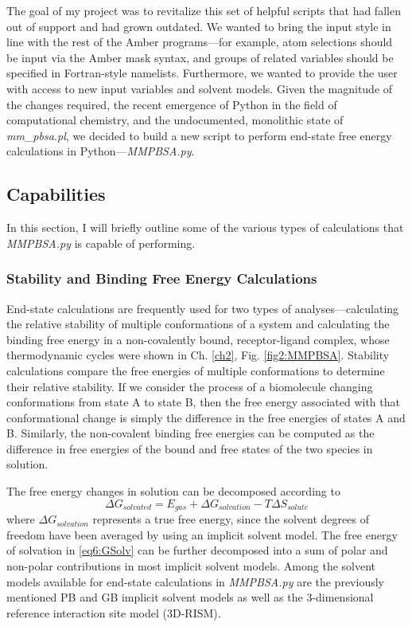 The goal of my project was to revitalize this set of helpful scripts that had
fallen out of support and had grown outdated. We wanted to bring the input style
in line with the rest of the Amber programs---for example, atom selections
should be input via the Amber mask syntax, and groups of related variables
should be specified in Fortran-style namelists. Furthermore, we wanted to
provide the user with access to new input variables and solvent models. Given
the magnitude of the changes required, the recent emergence of Python in the
field of computational chemistry, \cite{Sanner1999, Cock2009,
Michaud-Agrawal2011, MMPBSApy} and the undocumented, monolithic state of
\emph{mm\_pbsa.pl}, we decided to build a new script to perform end-state free
energy calculations in Python---\emph{MMPBSA.py}. \cite{MMPBSApy}

\subsection{Capabilities}

In this section, I will briefly outline some of the various types of
calculations that \emph{MMPBSA.py} is capable of performing.

\subsubsection{Stability and Binding Free Energy Calculations}

End-state calculations are frequently used for two types of
analyses---calculating the relative stability of multiple conformations of a
system and calculating the binding free energy in a non-covalently bound,
receptor-ligand complex, \cite{Homeyer2012} whose thermodynamic cycles were
shown in Ch. \ref{ch2}, Fig. \ref{fig2:MMPBSA}. Stability calculations compare
the free energies of multiple conformations to determine their relative
stability. If we consider the process of a biomolecule changing conformations
from state A to state B, then the free energy associated with that
conformational change is simply the difference in the free energies of states A
and B. Similarly, the non-covalent binding free energies can be computed as the
difference in free energies of the bound and free states of the two species in
solution.

The free energy changes in solution can be decomposed according to
\begin{equation}
   \Delta G_{solvated} = E_{gas} + \Delta G_{solvation} - T \Delta S_{solute}
   \label{eq6:GSolv}
\end{equation}
where $\Delta G_{solvation}$ represents a true free energy, since the solvent
degrees of freedom have been averaged by using an implicit solvent model. The
free energy of solvation in \ref{eq6:GSolv} can be further decomposed into a sum
of polar and non-polar contributions in most implicit solvent models. Among the
solvent models available for end-state calculations in \emph{MMPBSA.py} are the
previously mentioned PB and GB implicit solvent models as well as the
3-dimensional reference interaction site model (3D-RISM). \cite{Genheden2010}

